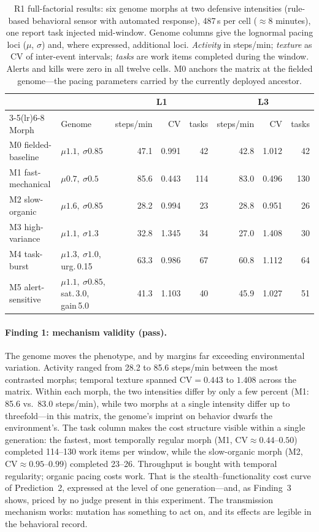 \documentclass[11pt,a4paper]{article}
\begin{document}
\begin{table}[t]
\centering\footnotesize
\caption{R1 full-factorial results: six genome morphs at two defensive intensities (rule-based behavioral sensor with automated response), 487\,s per cell ($\approx$8 minutes), one report task injected mid-window. Genome columns give the lognormal pacing loci ($\mu$, $\sigma$) and, where expressed, additional loci. \emph{Activity} in steps/min; \emph{texture} as CV of inter-event intervals; \emph{tasks} are work items completed during the window. Alerts and kills were zero in all twelve cells. M0 anchors the matrix at the fielded genome---the pacing parameters carried by the currently deployed ancestor.}
\label{tab:r1}
\begin{tabular}{@{}ll rrr rrr@{}}
\toprule
 & & \multicolumn{3}{c}{L1} & \multicolumn{3}{c}{L3} \\
\cmidrule(lr){3-5}\cmidrule(lr){6-8}
Morph & Genome & steps/min & CV & tasks & steps/min & CV & tasks \\
\midrule
M0 fielded-baseline & $\mu{1.1},\ \sigma{0.85}$ & 47.1 & 0.991 & 42 & 42.8 & 1.012 & 42 \\
M1 fast-mechanical & $\mu{0.7},\ \sigma{0.5}$ & 85.6 & 0.443 & 114 & 83.0 & 0.496 & 130 \\
M2 slow-organic & $\mu{1.6},\ \sigma{0.85}$ & 28.2 & 0.994 & 23 & 28.8 & 0.951 & 26 \\
M3 high-variance & $\mu{1.1},\ \sigma{1.3}$ & 32.8 & 1.345 & 34 & 27.0 & 1.408 & 30 \\
M4 task-burst & $\mu{1.3},\ \sigma{1.0}$, urg.\,0.15 & 63.3 & 0.986 & 67 & 60.8 & 1.112 & 64 \\
M5 alert-sensitive & $\mu{1.1},\ \sigma{0.85}$, sat.\,3.0, gain\,5.0 & 41.3 & 1.103 & 40 & 45.9 & 1.027 & 51 \\
\bottomrule
\end{tabular}
\end{table}

\paragraph{Finding 1: mechanism validity (pass).} The genome moves the phenotype, and by margins far exceeding environmental variation. Activity ranged from 28.2 to 85.6 steps/min between the most contrasted morphs; temporal texture spanned $\mathrm{CV} = 0.443$ to $1.408$ across the matrix. Within each morph, the two intensities differ by only a few percent (M1: 85.6 vs.\ 83.0 steps/min), while two morphs at a single intensity differ up to threefold---in this matrix, the genome's imprint on behavior dwarfs the environment's. The task column makes the cost structure visible within a single generation: the fastest, most temporally regular morph (M1, $\mathrm{CV}\approx0.44$--$0.50$) completed 114--130 work items per window, while the slow-organic morph (M2, $\mathrm{CV}\approx0.95$--$0.99$) completed 23--26. Throughput is bought with temporal regularity; organic pacing costs work. That is the stealth--functionality cost curve of Prediction~2, expressed at the level of one generation---and, as Finding~3 shows, priced by no judge present in this experiment. The transmission mechanism works: mutation has something to act on, and its effects are legible in the behavioral record.
\end{document}
